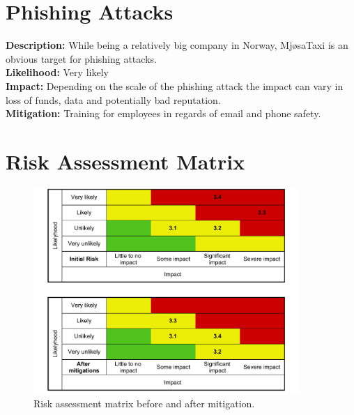 \section{Phishing Attacks}
\textbf{Description:} While being a relatively big company in Norway, MjøsaTaxi is an obvious target for phishing attacks.  \\
\textbf{Likelihood:} Very likely\\
\textbf{Impact:} Depending on the scale of the phishing attack the impact can vary in loss of funds, data and potentially bad reputation.\\
\textbf{Mitigation:} Training for employees in regards of email and phone safety.

\section{Risk Assessment Matrix}
\begin{figure}[h]
\centering
\includegraphics[width=0.9\textwidth]{fig/riskMatrix.pdf}
\caption{\label{fig:RiskMatrix}Risk assessment matrix before and after mitigation.}
\end{figure}

